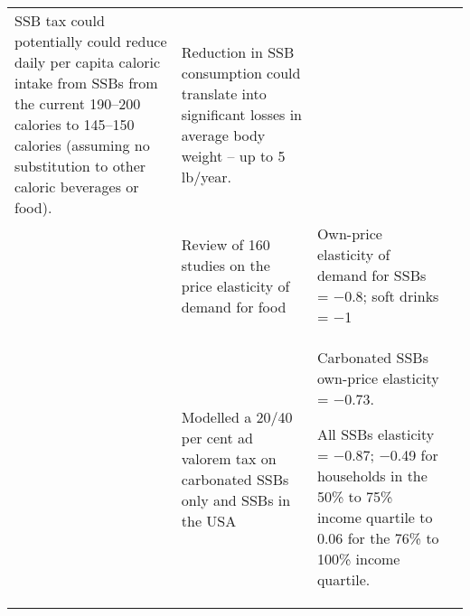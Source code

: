 \begin{longtable}{Xp{4.5cm}p{9.9cm}p{6.2cm}}
SSB tax could potentially could reduce daily per capita caloric intake from SSBs from the current 190--200 calories to 145--150 calories (assuming no substitution to other caloric beverages or food). & Reduction in SSB consumption could translate into significant losses in average body weight -- up to 5 lb/year. \\
\textcite{Andreyeva2010impactfoodprices} & Review of 160 studies on the price elasticity of demand for food & Own-price elasticity of demand for SSBs = $-$0.8; soft drinks = $-$1\\
\textcite{Finkelstein2010EconomicsObesity} & Modelled a 20/40 per cent ad valorem tax on carbonated SSBs only and SSBs in the USA & Carbonated SSBs own-price elasticity = \(-0.73\).

All SSBs elasticity = $-$0.87; $-$0.49 for households in the 50\% to 75\% income quartile to 0.06 for the 76\% to 100\% income quartile. & \\
\end{longtable}